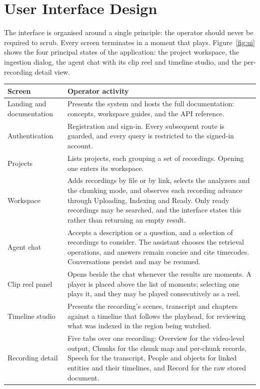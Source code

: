 \section{User Interface Design}

The interface is organised around a single principle: the operator should never be
required to scrub. Every screen terminates in a moment that plays.
Figure~\ref{fig:ui} shows the four principal states of the application: the project
workspace, the ingestion dialog, the agent chat with its clip reel and timeline studio,
and the per-recording detail view.


\begin{table}[htbp]
\centering
\small
\begin{tabularx}{\textwidth}{@{}L{3.4cm}X@{}}
\toprule
\textbf{Screen} & \textbf{Operator activity} \\
\midrule
Landing and documentation & Presents the system and hosts the full documentation: concepts, workspace guides, and the API reference. \\
Authentication  & Registration and sign-in. Every subsequent route is guarded, and every query is restricted to the signed-in account. \\
Projects        & Lists projects, each grouping a set of recordings. Opening one enters its workspace. \\
Workspace       & Adds recordings by file or by link, selects the analyzers and the chunking mode, and observes each recording advance through Uploading, Indexing and Ready. Only ready recordings may be searched, and the interface states this rather than returning an empty result. \\
Agent chat      & Accepts a description or a question, and a selection of recordings to consider. The assistant chooses the retrieval operations, and answers remain concise and cite timecodes. Conversations persist and may be resumed. \\
Clip reel panel & Opens beside the chat whenever the results are moments. A player is placed above the list of moments; selecting one plays it, and they may be played consecutively as a reel. \\
Timeline studio & Presents the recording's scenes, transcript and chapters against a timeline that follows the playhead, for reviewing what was indexed in the region being watched. \\
Recording detail & Five tabs over one recording: Overview for the video-level output, Chunks for the chunk map and per-chunk records, Speech for the transcript, People and objects for linked entities and their timelines, and Record for the raw stored document. \\
\bottomrule
\end{tabularx}
\end{table}

